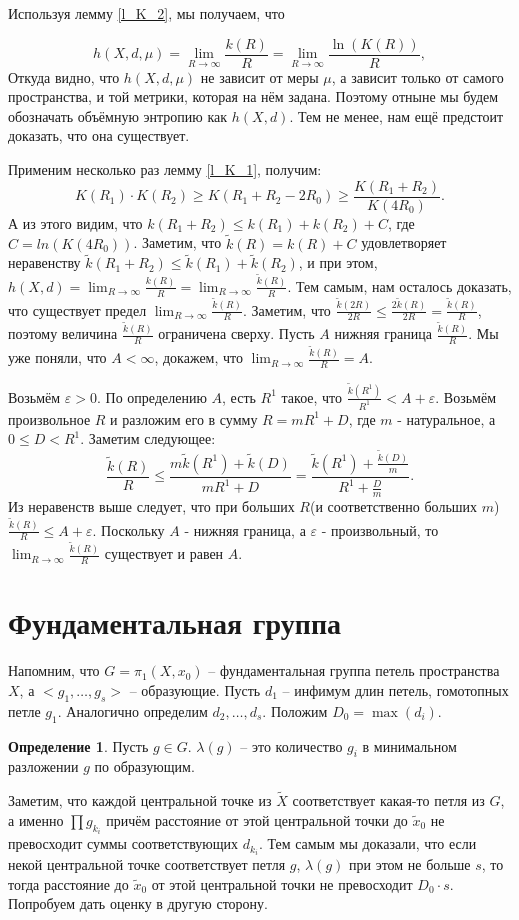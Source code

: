 \documentclass[11pt]{article}
\theoremstyle{definition}
\newtheorem{defin}{Определение}%
\theoremstyle{plain}
\theoremstyle{plain}
\def\leq{\leqslant}
\def\geq{\geqslant}
\def\wt#1{\widetilde{#1}}
\def\eps{\varepsilon}
\begin{document}
Используя лемму \ref{l_K_2}, мы получаем, что 

$$
	h(X, d, \mu) = \lim_{R \rightarrow \infty} \frac{k(R)} {R} = \lim_{R \rightarrow \infty} \frac{\ln (K(R))} {R},
$$
Откуда видно, что $h(X, d, \mu)$ не зависит от меры $\mu$, а зависит только от самого пространства, и той метрики, которая на нём задана.
Поэтому отныне мы будем обозначать объёмную энтропию как $h(X, d)$.
Тем не менее, нам ещё предстоит доказать, что она существует.

Применим несколько раз лемму \ref{l_K_1}, получим:
$$
  K(R_1) \cdot K(R_2) \geq K(R_1 + R_2 - 2 R_0) \geq \frac{K(R_1 + R_2)}{K(4 R_0)}.
$$
А из этого видим, что $k(R_1 + R_2) \leq k(R_1) + k(R_2) + C$, где $C = ln(K(4 R_0))$.
Заметим, что $\wt{k}(R) = k(R) + C$ удовлетворяет неравенству $\wt{k}(R_1 + R_2) \leq \wt{k}(R_1) + \wt{k}(R_2)$, и при этом,
$h(X,d) = \lim_{R \rightarrow \infty} \frac{k(R)}{R} = \lim_{R \rightarrow \infty} \frac{\wt{k}(R)}{R}$.
Тем самым, нам осталось доказать, что существует предел $\lim_{R \rightarrow \infty} \frac{\wt{k}(R)}{R}$.
Заметим, что $\frac{\wt{k}(2R)}{2R} \leq \frac{2\wt{k}(R)}{2R} = \frac{\wt{k}(R)}{R}$, поэтому величина $\frac{\wt{k}(R)}{R}$ ограничена сверху.
Пусть $A$ нижняя граница $\frac{\wt{k}(R)}{R}$. Мы уже поняли, что $A < \infty$, докажем, что $\lim_{R \rightarrow \infty} \frac{\wt{k}(R)}{R} = A$.

Возьмём $\eps > 0$. По определению $A$, есть $R^1$ такое, что $\frac{\wt{k}(R^1)}{R^1} < A + \eps$. 
Возьмём произвольное $R$ и разложим его в сумму $R = m R^1 + D$, где $m$ - натуральное, а $0 \leq D < R^1$. 
Заметим следующее:
$$
\frac{\wt{k}(R)}{R} \leq 
\frac{m \wt{k}(R^1) + \wt{k}(D)}{m R^1 + D} =
\frac{\wt{k}(R^1) + \frac{\wt{k}(D)}{m}}{R^1 + \frac{D}{m}} .
$$
Из неравенств выше следует, что при больших $R$(и соответственно больших $m$) $\frac{\wt{k}(R)}{R} \leq A + \eps$. 
Поскольку $A$ - нижняя граница, а $\eps$ - произвольный, то $\lim_{R \rightarrow \infty} \frac{\wt{k}(R)}{R}$ существует и равен $A$.




\section{Фундаментальная группа}
Напомним, что $G = \pi_1(X, x_0)$ -- фундаментальная группа петель пространства $X$, а $<g_1,\dots,g_s>$ -- образующие.
Пусть $d_1$ -- инфимум длин петель, гомотопных петле $g_1$. Аналогично определим $d_2,\dots,d_s$.
Положим $D_0 = \max(d_i)$.
\begin{defin}
Пусть $g \in G$. $\lambda(g)$ -- это количество $g_i$ в минимальном разложении $g$ по образующим.
\end{defin}
Заметим, что каждой центральной точке из $\wt{X}$ соответствует какая-то петля из $G$, а именно $\prod g_{k_i}$ 
причём расстояние от этой центральной точки до $\wt{x}_0$ не превосходит суммы соответствующих $d_{k_i}$. 
Тем самым мы доказали, что если некой центральной точке соответствует петля $g$,
$\lambda(g)$ при этом не больше $s$, то тогда расстояние до $\wt{x}_0$ от этой центральной точки не превосходит $D_0 \cdot s$.
Попробуем дать оценку в другую сторону.
\end{document}
